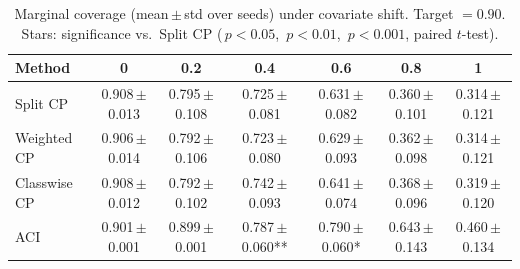 \begin{table}[t]\centering
\caption{Marginal coverage (mean\,$\pm$\,std over seeds) under covariate shift. Target $=0.90$. Stars: significance vs.\ Split CP (\*\,$p{<}0.05$, \*\*\,$p{<}0.01$, \*\*\*\,$p{<}0.001$, paired $t$-test).}
\label{tab:coverage_covariate}
\begin{tabular}{lcccccc}
\toprule
Method & 0 & 0.2 & 0.4 & 0.6 & 0.8 & 1 \\
\midrule
Split CP & 0.908\,{\scriptsize$\pm$0.013} & 0.795\,{\scriptsize$\pm$0.108} & 0.725\,{\scriptsize$\pm$0.081} & 0.631\,{\scriptsize$\pm$0.082} & 0.360\,{\scriptsize$\pm$0.101} & 0.314\,{\scriptsize$\pm$0.121} \\
Weighted CP & 0.906\,{\scriptsize$\pm$0.014} & 0.792\,{\scriptsize$\pm$0.106} & 0.723\,{\scriptsize$\pm$0.080} & 0.629\,{\scriptsize$\pm$0.093} & 0.362\,{\scriptsize$\pm$0.098} & 0.314\,{\scriptsize$\pm$0.121} \\
Classwise CP & 0.908\,{\scriptsize$\pm$0.012} & 0.792\,{\scriptsize$\pm$0.102} & 0.742\,{\scriptsize$\pm$0.093} & 0.641\,{\scriptsize$\pm$0.074} & 0.368\,{\scriptsize$\pm$0.096} & 0.319\,{\scriptsize$\pm$0.120} \\
ACI & 0.901\,{\scriptsize$\pm$0.001} & 0.899\,{\scriptsize$\pm$0.001} & 0.787\,{\scriptsize$\pm$0.060}** & 0.790\,{\scriptsize$\pm$0.060}* & 0.643\,{\scriptsize$\pm$0.143} & 0.460\,{\scriptsize$\pm$0.134} \\
\bottomrule
\end{tabular}
\end{table}